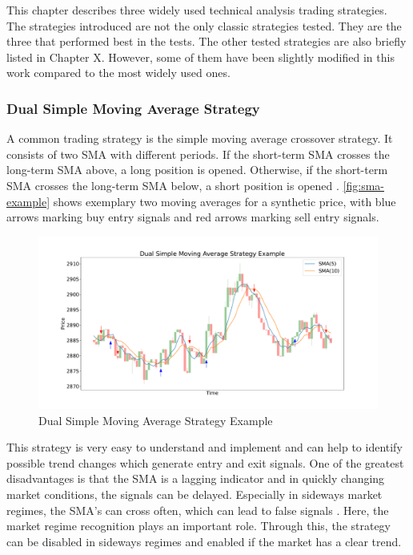 This chapter describes three widely used technical analysis trading strategies.
The strategies introduced are not the only classic strategies tested.
They are the three that performed best in the tests.
The other tested strategies are also briefly listed in Chapter X. %
However, some of them have been slightly modified in this work compared to the most widely used ones.

\subsubsection{Dual Simple Moving Average Strategy}
\label{chap:sma2}

A common trading strategy is the simple moving average crossover strategy.
It consists of two SMA with different periods.
If the short-term SMA crosses the long-term SMA above, a long position is opened.
Otherwise, if the short-term SMA crosses the long-term SMA below, a short position is opened \cite{sma-strategy-basics}.
\autoref{fig:sma-example} shows exemplary two moving averages for a synthetic price, with blue arrows marking buy entry signals and red arrows marking sell entry signals.

\begin{figure}[H]
    \centering
    \includegraphics[width=\textwidth]{images/trading-strategies/sma-example}
    \caption{Dual Simple Moving Average Strategy Example}
    \label{fig:sma-example}
\end{figure}

\noindent
This strategy is very easy to understand and implement and can help to identify possible trend changes which generate entry and exit signals.
One of the greatest disadvantages is that the SMA is a lagging indicator and in quickly changing market conditions, the signals can be delayed.
Especially in sideways market regimes, the SMA's can cross often, which can lead to false signals \cite{sma-advantage-disadvantage}.
Here, the market regime recognition plays an important role.
Through this, the strategy can be disabled in sideways regimes and enabled if the market has a clear trend.

